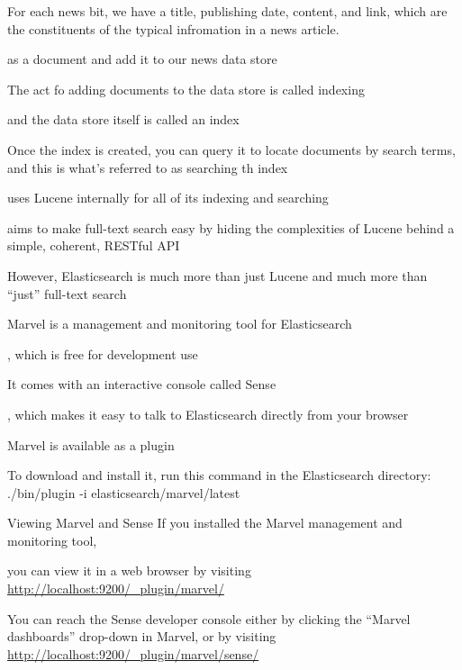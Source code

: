 
For each news bit, we have a title, publishing date, content, and link, which are the constituents of the typical infromation in a news article. 

as a document and add it to our news data store

The act fo adding documents to the data store is called indexing

and the data store itself is called an index

Once the index is created, you can query it to locate documents by search terms, and this is what's referred to as searching th index

uses Lucene internally for all of its indexing and searching

aims to make full-text search easy by hiding the complexities of Lucene behind a simple, coherent, RESTful API

However, Elasticsearch is much more than just Lucene and much more than “just” full-text search

Marvel is a management and monitoring tool for Elasticsearch

, which is free for development use

It comes with an interactive console called Sense

, which makes it easy to talk to Elasticsearch directly from your browser

Marvel is available as a plugin

To download and install it, run this command in the Elasticsearch directory: ./bin/plugin -i elasticsearch/marvel/latest 

Viewing Marvel and Sense If you installed the Marvel management and monitoring tool, 

you can view it in a web browser by visiting \url{http://localhost:9200/_plugin/marvel/}

You can reach the Sense developer console either by clicking the “Marvel dashboards” drop-down in Marvel, or by visiting \url{http://localhost:9200/_plugin/marvel/sense/}
